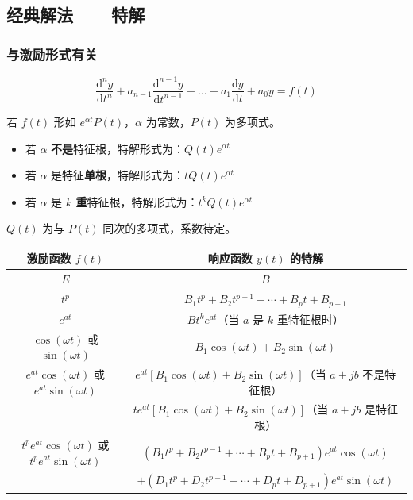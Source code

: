\documentclass[UTF8]{ctexart}
\begin{document}
\subsection{经典解法——特解}

\subsubsection{与激励形式有关}

$$
\dfrac{\mathrm{d}^n y}{\mathrm{d}t^n} + a_{n-1}\dfrac{\mathrm{d}^{n-1}y}{\mathrm{d}t^{n-1}} + \ldots + a_1\dfrac{\mathrm{d}y}{\mathrm{d}t} + a_0 y = f(t)
$$

若 $f(t)$ 形如 $e^{\alpha t}P(t)$，$\alpha$ 为常数，$P(t)$ 为多项式。

\begin{itemize}
    \item 若 $\alpha$ \textbf{不是}特征根，特解形式为：$Q(t)e^{\alpha t}$
    \item 若 $\alpha$ 是特征\textbf{单根}，特解形式为：$tQ(t)e^{\alpha t}$
    \item 若 $\alpha$ 是 \textbf{$k$ 重}特征根，特解形式为：$t^k Q(t)e^{\alpha t}$
\end{itemize}

$Q(t)$ 为与 $P(t)$ 同次的多项式，系数待定。

\begin{table}[H]
\centering
\begin{tabular}{c|c}
\hline
\textbf{激励函数 $f(t)$} & \textbf{响应函数 $y(t)$ 的特解} \\
\hline
$E$ & $B$ \\
\hline
$t^p$ & $B_1 t^p + B_2 t^{p-1} + \cdots + B_p t + B_{p+1}$ \\
\hline
$e^{at}$ & $Bt^k e^{at}$（当 $a$ 是 $k$ 重特征根时） \\
\hline
$\cos(\omega t)$ 或 $\sin(\omega t)$ & $B_1 \cos(\omega t) + B_2 \sin(\omega t)$ \\
\hline
$e^{at}\cos(\omega t)$ 或 $e^{at}\sin(\omega t)$ & $e^{at}\left[B_1 \cos(\omega t) + B_2 \sin(\omega t)\right]$（当 $a+jb$ 不是特征根） \\
& $te^{at}\left[B_1 \cos(\omega t) + B_2 \sin(\omega t)\right]$（当 $a+jb$ 是特征根） \\
\hline
$t^p e^{at}\cos(\omega t)$ 或 $t^p e^{at}\sin(\omega t)$ & $\left(B_1 t^p + B_2 t^{p-1} + \cdots + B_p t + B_{p+1}\right)e^{at}\cos(\omega t)$ \\
& $+ \left(D_1 t^p + D_2 t^{p-1} + \cdots + D_p t + D_{p+1}\right)e^{at}\sin(\omega t)$ \\
\hline
\end{tabular}
\end{table}
\end{document}
